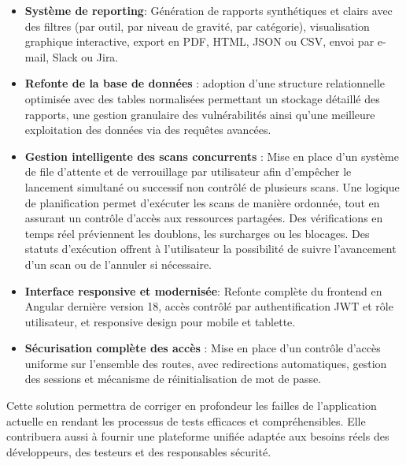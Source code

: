 \begin{itemize}[label=$\bullet$,left=0.09cm]
    \item \textbf{Système de reporting}: Génération de rapports synthétiques et clairs avec des filtres (par outil, par niveau de gravité, par catégorie), visualisation graphique interactive, export en PDF, HTML, JSON ou CSV, envoi par e-mail, Slack ou Jira.
    \item \textbf{Refonte de la base de données} : adoption d’une structure relationnelle optimisée avec des tables normalisées permettant un stockage détaillé des rapports, une gestion granulaire des vulnérabilités ainsi qu’une meilleure exploitation des données via des requêtes avancées.
    \item \textbf{Gestion intelligente des scans concurrents} : Mise en place d’un système de file d’attente et de verrouillage par utilisateur afin d’empêcher le lancement simultané ou successif non contrôlé de plusieurs scans. Une logique de planification permet d’exécuter les scans de manière ordonnée, tout en assurant un contrôle d’accès aux ressources partagées. Des vérifications en temps réel préviennent les doublons, les surcharges ou les blocages. Des statuts d’exécution offrent à l’utilisateur la possibilité de suivre l’avancement d’un scan ou de l’annuler si nécessaire.
    \item \textbf{Interface responsive et modernisée}: Refonte complète du frontend en Angular dernière version 18, accès contrôlé par authentification JWT\cite{jwt} et rôle utilisateur, et responsive design pour mobile et tablette.
    \item \textbf{Sécurisation complète des accès} : Mise en place d’un contrôle d’accès uniforme sur l’ensemble des routes, avec redirections automatiques, gestion des sessions et mécanisme de réinitialisation de mot de passe.
\end{itemize}
Cette solution permettra de corriger en profondeur les failles de l’application actuelle en rendant les processus de tests efficaces et compréhensibles. Elle contribuera aussi à fournir une plateforme unifiée adaptée aux besoins réels des développeurs, des testeurs et des responsables sécurité.
